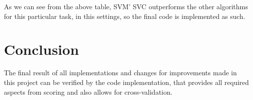 \documentclass[11pt]{article}
\begin{document}
As we can see from the above table, SVM' SVC outperforms the other algorithms for this particular task, in this settings, so the final code is implemented as such.

\section{Conclusion}

The final result of all implementations and changes for improvements made in this project can be verified by the code implementation, that provides all required aspects from scoring and also allows for cross-validation.



%
%



\appendix
\end{document}
